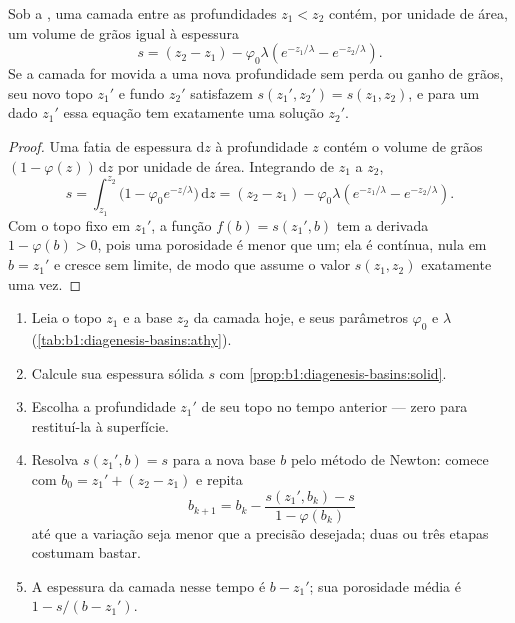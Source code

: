 \begin{proposition}\label{prop:b1:diagenesis-basins:solid}
Sob a , uma camada entre as profundidades $z_1 < z_2$ contém, por unidade de
área, um volume de grãos igual à espessura
\[
  s = (z_2 - z_1) - \varphi_0 \lambda \left( e^{-z_1/\lambda} - e^{-z_2/\lambda} \right).
\]
Se a camada for movida a uma nova profundidade sem perda ou ganho de grãos, seu novo topo
$z_1'$ e fundo $z_2'$ satisfazem $s(z_1', z_2') = s(z_1, z_2)$, e para um dado $z_1'$ essa
equação tem exatamente uma solução $z_2'$.
\end{proposition}

\begin{proof}
Uma fatia de espessura $\mathrm dz$ à profundidade $z$ contém o volume de grãos
$(1 - \varphi(z))\,\mathrm dz$ por unidade de área. Integrando de $z_1$ a $z_2$,
\[
  s = \int_{z_1}^{z_2} \bigl(1 - \varphi_0 e^{-z/\lambda}\bigr)\,\mathrm dz
    = (z_2 - z_1) - \varphi_0\lambda\left(e^{-z_1/\lambda} - e^{-z_2/\lambda}\right).
\]
Com o topo fixo em $z_1'$, a função $f(b) = s(z_1', b)$ tem a derivada $1 - \varphi(b) > 0$,
pois uma porosidade é menor que um; ela é contínua, nula em $b = z_1'$ e cresce sem limite,
de modo que assume o valor $s(z_1, z_2)$ exatamente uma vez.
\end{proof}

\begin{method}\label{met:b1:diagenesis-basins:decompaction}
\begin{enumerate}
  \item Leia o topo $z_1$ e a base $z_2$ da camada hoje, e seus parâmetros $\varphi_0$ e
        $\lambda$
        (\cref{tab:b1:diagenesis-basins:athy}).
  \item Calcule sua espessura sólida $s$ com
        \cref{prop:b1:diagenesis-basins:solid}.
  \item Escolha a profundidade $z_1'$ de seu topo no tempo anterior --- zero para
        restituí-la à superfície.
  \item Resolva $s(z_1', b) = s$ para a nova base $b$ pelo método de Newton: comece com
        $b_0 = z_1' + (z_2 - z_1)$ e repita
        \[
          b_{k+1} = b_k - \frac{s(z_1', b_k) - s}{1 - \varphi(b_k)}
        \]
        até que a variação seja menor que a precisão desejada; duas ou três etapas costumam
        bastar.
  \item A espessura da camada nesse tempo é $b - z_1'$; sua porosidade média é
        $1 - s/(b - z_1')$.
\end{enumerate}
\end{method}


